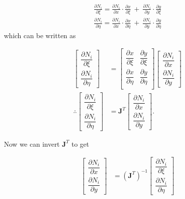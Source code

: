 \documentclass[11pt,letterpaper,titlepage]{article}
\newcommand{\beq}{\begin{equation*}
\begin{aligned}}
\newcommand{\eeq}{\end{aligned}
\end{equation*}}
\newcommand{\beqn}{\begin{equation}
	\begin{aligned}}
\newcommand{\eeqn}{\end{aligned}
	\end{equation}}
\numberwithin{equation}{section}
\begin{document}
\beq 
\frac{\partial N_i}{\partial \xi} = 
\frac{\partial N_i}{\partial x}\cdot \frac{\partial x}{\partial \xi} \ + \ 
\frac{\partial N_i}{\partial y}\cdot  \frac{\partial y}{\partial \xi}
\eeq 
\beq 
\frac{\partial N_i}{\partial \eta} = 
\frac{\partial N_i}{\partial x}\cdot \frac{\partial x}{\partial \eta} \ + \ 
\frac{\partial N_i}{\partial y}\cdot  \frac{\partial y}{\partial \eta}
\eeq 
\newline
which can be written as

\begingroup
\renewcommand*{\arraystretch}{1.5}
\beq
\begin{bmatrix}
\dfrac{\partial N_i}{\partial \xi} \\
\dfrac{\partial N_i}{\partial \eta}
\end{bmatrix}
&=
\begin{bmatrix}
\dfrac{\partial x}{\partial \xi}   &\dfrac{\partial y}{\partial \xi} \\
\dfrac{\partial x}{\partial \eta}   &\dfrac{\partial y}{\partial \eta} \\
\end{bmatrix}
\begin{bmatrix}
\dfrac{\partial N_i}{\partial x} \\
\dfrac{\partial N_i}{\partial y}
\end{bmatrix} \\
\therefore 
\begin{bmatrix}
\dfrac{\partial N_i}{\partial \xi} \\
\dfrac{\partial N_i}{\partial \eta}
\end{bmatrix}
&= \mathbf{J}^T 
\begin{bmatrix}
\dfrac{\partial N_i}{\partial x} \\
\dfrac{\partial N_i}{\partial y}
\end{bmatrix}.
\eeq 
\endgroup

Now we can invert $\mathbf{J}^T$ to get

\begingroup
\renewcommand*{\arraystretch}{1.5}
\beqn \label{eq:derivativeNtriangle}
\begin{bmatrix}
\dfrac{\partial N_i}{\partial x} \\
\dfrac{\partial N_i}{\partial y}
\end{bmatrix}
&=
(\mathbf{J}^T)^{-1}
\begin{bmatrix}
\dfrac{\partial N_i}{\partial \xi} \\
\dfrac{\partial N_i}{\partial \eta}
\end{bmatrix}
\eeqn 
\endgroup
\end{document}
